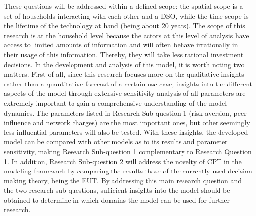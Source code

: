 These questions will be addressed within a defined scope: the spatial scope is a set of households interacting with each other and a DSO, while the time scope is the lifetime of the technology at hand (being about 20 years). The scope of this research is at the household level because the actors at this level of analysis have access to limited amounts of information and will often behave irrationally in their usage of this information. Thereby, they will take less rational investment decisions. In the development and analysis of this model, it is worth noting two matters. First of all, since this research focuses more on the qualitative insights rather than a quantitative forecast of a certain use case, insights into the different aspects of the model through extensive sensitivity analysis of all parameters are extremely important to gain a comprehensive understanding of the model dynamics. The parameters listed in Research Sub-question 1 (risk aversion, peer influence and network charges) are the most important ones, but other seemingly less influential parameters will also be tested. With these insights, the developed model can be compared with other models as to its results and parameter sensitivity, making Research Sub-question 1 complementary to Research Question 1. In addition, Research Sub-question 2 will address the novelty of CPT in the modeling framework by comparing the results those of the currently used decision making theory, being the EUT. By addressing this main research question and the two research sub-questions, sufficient insights into the model should be obtained to determine in which domains the model can be used for further research.
